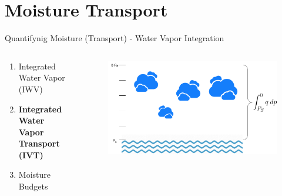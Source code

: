 \section{Moisture Transport}

\begin{frame}{Quantifynig Moisture (Transport) - Water Vapor Integration}
  \begin{columns}
    \begin{column}{.5 \textwidth}
    \begin{enumerate}
    \item Integrated Water Vapor (IWV) \cite{gimeno_atmospheric_2014, eiras-barca_seasonal_2016, bao_interpretation_2006, ma_atmospheric_nodate}
    \item \textbf{Integrated Water Vapor Transport (IVT)} \cite{zhu_proposed_1998, sousa_north_2020, jiang_impact_2017, ayantobo_integrated_2022, allan_diagnosing_2016, ralph_dropsonde_2017, ralph_scale_2019}
    \item Moisture Budgets \cite{seager_mechanisms_2020, yang_moisture_2022}
  \end{enumerate}
      
    \end{column}
    \begin{column}{.5 \textwidth}
          \begin{figure}[h]
      \centering
      \includegraphics[width=\columnwidth]{imglib/water_vapor_integration.png}
    \end{figure}
    \end{column}
    
  \end{columns}
\end{frame}

